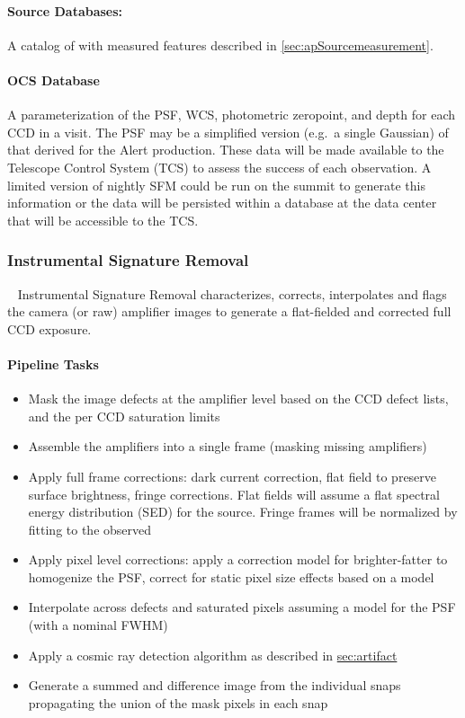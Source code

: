 \paragraph*{Source Databases:} A catalog of \Sources with measured features described in \ref{sec:apSourcemeasurement}. 

\paragraph*{OCS Database} A parameterization of the PSF, WCS, photometric zeropoint, and depth for each CCD in a visit. The PSF may be a simplified version (e.g.\ a single Gaussian) of that derived for the Alert production. These data will be made available to the Telescope Control System (TCS) to assess the success of each observation. A limited version of nightly SFM could be run on the summit to generate this information or the  data will be persisted within a database at the data center that will be accessible to the TCS.


\subsubsection{Instrumental Signature Removal}~
\label{sec:apISR}
Instrumental Signature Removal characterizes, corrects, interpolates and flags the camera (or raw) amplifier images to generate a flat-fielded and corrected full CCD exposure.

\paragraph{Pipeline Tasks}
\begin{itemize}
\item Mask the image defects at the amplifier level based on the CCD defect lists, and the per CCD saturation limits
\item Assemble the amplifiers into a single frame (masking missing amplifiers)
\item Apply full frame corrections: dark current correction, flat field to preserve surface brightness, fringe corrections. Flat fields will assume a flat spectral energy distribution (SED) for the source. Fringe frames will be normalized by fitting to the observed 
\item Apply pixel level corrections: apply a correction model for brighter-fatter to homogenize the PSF, correct for static pixel size effects based on a model
\item Interpolate across defects and saturated pixels assuming a model for the PSF (with a nominal FWHM)
\item Apply a cosmic ray detection algorithm as described in \hyperref[sec:artifact]{sec:artifact}
\item Generate a summed and difference image from the individual snaps propagating the union of the mask pixels in each snap
\end{itemize}

